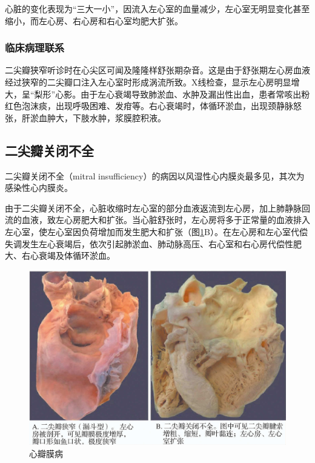 心脏的变化表现为“三大一小”，因流入左心室的血量减少，左心室无明显变化甚至缩小，而左心房、右心房和右心室均肥大扩张。

\subsubsection{临床病理联系}

二尖瓣狭窄听诊时在心尖区可闻及隆隆样舒张期杂音。这是由于舒张期左心房血液经过狭窄的二尖瓣口注入左心室时形成涡流所致。X线检查，显示左心房明显增大，呈“梨形”心影。由于左心衰竭导致肺淤血、水肿及漏出性出血，患者常咳出粉红色泡沫痰，出现呼吸困难、发疳等。右心衰竭时，体循环淤血，出现颈静脉怒张，肝淤血肿大，下肢水肿，浆膜腔积液。

\subsection{二尖瓣关闭不全}

二尖瓣关闭不全（mitral
insufficiency）的病因以风湿性心内膜炎最多见，其次为感染性心内膜炎。

由于二尖瓣关闭不全，心脏收缩时左心室的部分血液返流到左心房，加上肺静脉回流的血液，致左心房肥大和扩张。当心脏舒张时，左心房将多于正常量的血液排入左心室，使左心室因负荷增加而发生肥大和扩张（图\ref{fig6-14}B）。在左心房和左心室代偿失调发生左心衰竭后，依次引起肺淤血、肺动脉高压、右心室和右心房代偿性肥大、右心衰竭及体循环淤血。

\begin{figure}[!htbp]
    \centering
    \includegraphics{./images/Image00107.jpg}
    \captionsetup{justification=centering}
    \caption{心瓣膜病}
    \label{fig6-14}
\end{figure}


